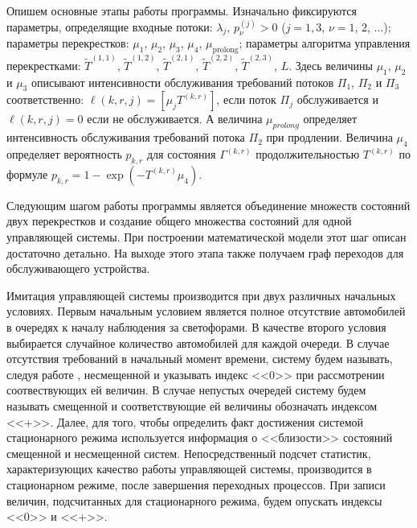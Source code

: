 Опишем основные этапы работы программы. Изначально фиксируются параметры, определящие входные потоки:
$\lambda_j$,  $p_{\nu}^{(j)}>0$ ($j=1,3$, $\nu=1$, $2$, $\ldots$); параметры перекрестков: $\mu_1$, $\mu_2$,  $\mu_3$, $\mu_4$, $\mu_{\mathrm{prolong}}$; параметры алгоритма управления перекрестками: $\widetilde T^{(1,1)}$, $\widetilde T^{(1,2)}$, $\widetilde T^{(2,1)}$, $\widetilde T^{(2,2)}$, $\widetilde T^{(2,3)}$, $L$. Здесь величины $\mu_1$, $\mu_2$ и $\mu_3$  описывают интенсивности обслуживания требований потоков $\Pi_1$, $\Pi_2$ и $\Pi_3$ соответственно: $\ell(k,r,j)=[\mu_j T^{(k,r)}]$, если  поток $\Pi_j$ обслуживается и $\ell(k,r,j)=0$ если не обслуживается. А величина $\mu_{prolong}$ определяет интенсивность обслуживания требований потока $\Pi_2$ при продлении. Величина $\mu_4$ определяет вероятность $p_{k,r}$ для состояния $\Gamma^{(k,r)}$ продолжительностью $T^{(k,r)}$ по формуле $p_{k,r} = 1- \exp{(- T^{(k,r)} \mu_4)}$.  


Следующим шагом работы программы является объединение множеств состояний двух перекрестков и создание общего множества состояний для одной управляющей системы. При построении математической модели этот шаг описан достаточно детально. На выходе этого этапа также получаем граф переходов для обслуживающего устройства.

Имитация управляющей системы производится при двух различных начальных условиях. Первым начальным условием является полное отсутствие автомобилей в очередях к началу наблюдения за светофорами. В качестве второго условия выбирается случайное количество автомобилей для каждой очереди. В случае отсутствия требований в начальный момент времени, систему будем называть, следуя работе \cite{FedotkinRachinskaya:2016}, несмещенной и указывать индекс <<0>> при рассмотрении соотвествующих ей величин. В случае непустых очередей систему будем называть смещенной и соответствующие ей величины обозначать индексом <<+>>. Далее, для того, чтобы определить факт достижения системой стационарного режима используется информация о <<близости>> состояний смещенной и несмещенной систем. Непосредственный подсчет статистик, характеризующих качество работы управляющей системы, производится в стационарном режиме, после завершения переходных процессов. При записи величин, подсчитанных для стационарного режима, будем опускать индексы <<0>> и <<+>>.

